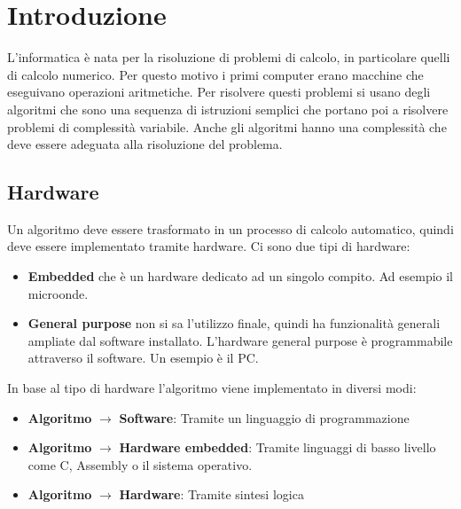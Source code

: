 \documentclass[a4paper]{article}
\theoremstyle{break}
\theoremstyle{break}
\theoremstyle{break}
\theoremstyle{break}
\begin{document}

\newcommand{\fulladder}[2] %
{\draw[rotate=#2] (#1) 
  (0,0) node[component adder, rotate=-90+#2] {+}
;}

\newcommand{\registry}[2] %
{\draw[rotate=#2] (#1) 
  (0,0) node[component registry, rotate=-90+#2] {\rotatebox{90}{REG}}
;}





\tableofcontents
\pagebreak
\section{Introduzione}
L'informatica è nata per la risoluzione di problemi di calcolo, in particolare
quelli di calcolo numerico. Per questo motivo i primi computer erano macchine
che eseguivano operazioni aritmetiche. Per risolvere questi problemi si usano
degli algoritmi che sono una sequenza di istruzioni semplici che portano poi
a risolvere problemi di complessità variabile. Anche gli algoritmi hanno una
complessità che deve essere adeguata alla risoluzione del problema.

\subsection{Hardware}
Un algoritmo deve essere trasformato in un processo di calcolo automatico,
quindi deve essere implementato tramite hardware. Ci sono due tipi di hardware:
\begin{itemize}
	\item \textbf{Embedded} che è un hardware dedicato ad un singolo compito.
	      Ad esempio il microonde.
	\item \textbf{General purpose} non si sa l'utilizzo finale, quindi ha
	      funzionalità generali ampliate dal software installato. L'hardware
	      general purpose è programmabile attraverso il software. Un esempio
	      è il PC.
\end{itemize}

In base al tipo di hardware l'algoritmo viene implementato in diversi modi:
\begin{itemize}
	\item \textbf{Algoritmo} \( \to  \) \textbf{Software}: Tramite un linguaggio di programmazione
	\item \textbf{Algoritmo} \( \to  \)  \textbf{Hardware embedded}: Tramite linguaggi di basso livello
	      come C, Assembly o il sistema operativo.
	\item \textbf{Algoritmo} \( \to  \)  \textbf{Hardware}: Tramite sintesi logica
\end{itemize}
\end{document}
